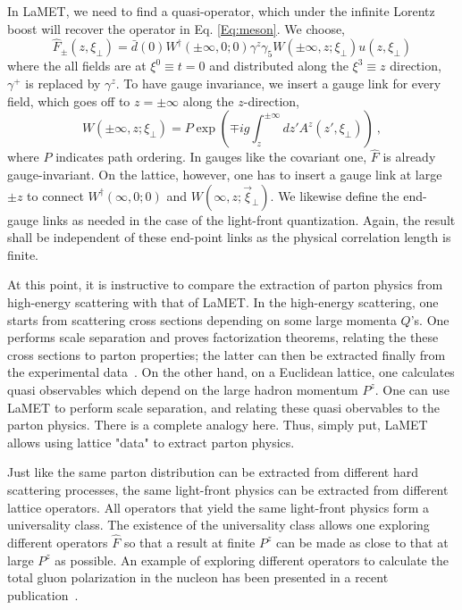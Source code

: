 In LaMET, we need to find a quasi-operator, which under the infinite Lorentz boost will recover
the operator in Eq. \ref{Eq:meson}. We choose,
\begin{equation}
      \hat F_\pm(z, \xi_\perp) = \bar d (0)W^\dagger(\pm\infty,0;0) \gamma^z\gamma_5 W(\pm\infty,z;\xi_\perp)u(z,\xi_\perp)
\end{equation}
where the all fields are at $\xi^0\equiv t = 0$ and distributed along the $\xi^3\equiv z$ direction, $\gamma^+$ is replaced by
$\gamma^z$. To have gauge invariance, we insert a gauge link for every field, which
goes off to $z=\pm \infty$ along the $z$-direction,
\begin{equation}
        W(\pm\infty, z; \xi_\perp) = P\exp\left(\mp ig\int^{\pm\infty}_z dz'A^z(z', \xi_\perp)\right) \ ,
\end{equation}
where $P$ indicates path ordering.
In gauges like the covariant one, $\hat F$ is already gauge-invariant. On the lattice, however,
one has to insert a gauge link at large $\pm z$ to connect $W^\dagger(\infty,0;0)$
and $W(\infty,z;\vec{\xi}_\perp)$. We likewise define the end-gauge links as needed in the case
of the light-front quantization. Again, the result shall be independent of these end-point links
as the physical correlation length is finite.

At this point, it is instructive to compare the extraction of parton physics from high-energy scattering
with that of LaMET. In the high-energy scattering, one starts from scattering cross sections depending on
some large momenta $Q$'s. One performs scale separation and proves factorization theorems, relating the
these cross sections to parton properties; the latter can then be extracted finally from the
experimental data~\cite{Gao:2013xoa}. On the other hand, on a Euclidean lattice, one calculates quasi
observables which depend on the large hadron momentum $P^z$. One can use LaMET to perform scale separation,
and relating these quasi obervables to the parton physics. There is a complete analogy here.
Thus, simply put, LaMET allows using lattice "data" to extract parton physics.

Just like the same parton distribution can be extracted from different hard scattering processes, the same
light-front physics can be extracted from different lattice operators. All operators that yield the same light-front
physics form a universality class. The existence of the universality class allows one
exploring different operators $\hat F$ so that a result at finite $P^z$ can be made as close to that at large
$P^z$ as possible. An example of exploring different operators to calculate the total gluon polarization
in the nucleon has been presented in a recent publication~\cite{Hatta:2013gta}.

